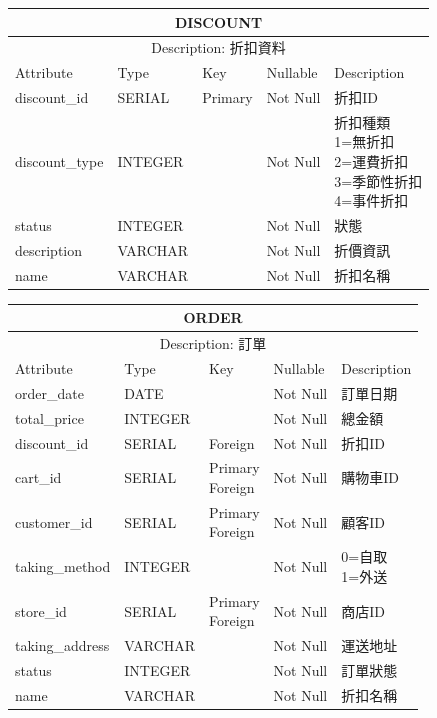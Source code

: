 \documentclass[a4paper, 12pt]{article}
\begin{document}
\noindent\begin{tabular}{ | p{7em} | p{5.5em} | p{5.5em} | p{4.5em} | p{11em} |}
  \hline
  \multicolumn{5}{|c|}{DISCOUNT} \tabularnewline
  \hline 
  \multicolumn{5}{|c|}{Description: 折扣資料} \tabularnewline
  \hline 
  Attribute & Type & Key & Nullable & Description \\
  \hline
  discount_id & SERIAL & Primary & Not Null & 折扣ID \\
  \hline
  discount_type & INTEGER &  & Not Null & \makecell[l]{折扣種類\\1=無折扣\\2=運費折扣\\3=季節性折扣\\4=事件折扣} \\
  \hline
  status & INTEGER & &Not Null &狀態\\
  \hline
  description& VARCHAR &  &Not Null &折價資訊\\
  \hline
  name & VARCHAR &  &Not Null &折扣名稱\\
  \hline
\end{tabular}
\vspace{1em}

\noindent\begin{tabular}{ | p{7em} | p{5.5em} | p{5.5em} | p{4.5em} | p{11em} |}
  \hline
  \multicolumn{5}{|c|}{ORDER} \tabularnewline
  \hline 
  \multicolumn{5}{|c|}{Description: 訂單} \tabularnewline
  \hline 
  Attribute & Type & Key & Nullable & Description \\
  \hline
  order_date & DATE &  & Not Null & 訂單日期 \\
  \hline
  total_price & INTEGER &  & Not Null & 總金額 \\
  \hline
  discount_id & SERIAL & Foreign&Not Null &折扣ID\\
  \hline
  cart_id& SERIAL & \makecell[l]{Primary \\ Foreign} &Not Null &購物車ID\\
  \hline
  customer_id & SERIAL & \makecell[l]{Primary \\ Foreign} & Not Null & 顧客ID \\
  \hline
  taking_method & INTEGER &  & Not Null &  \makecell[l]{0=自取\\1=外送}\\
  \hline
  store_id & SERIAL & \makecell[l]{Primary \\ Foreign} & Not Null & 商店ID \\
  \hline
  taking_address & VARCHAR &  & Not Null & 運送地址 \\
  \hline
  status & INTEGER &  & Not Null & 訂單狀態 \\
  \hline
  
  name & VARCHAR &  &Not Null &折扣名稱\\
  \hline
\end{tabular}
\end{document}
